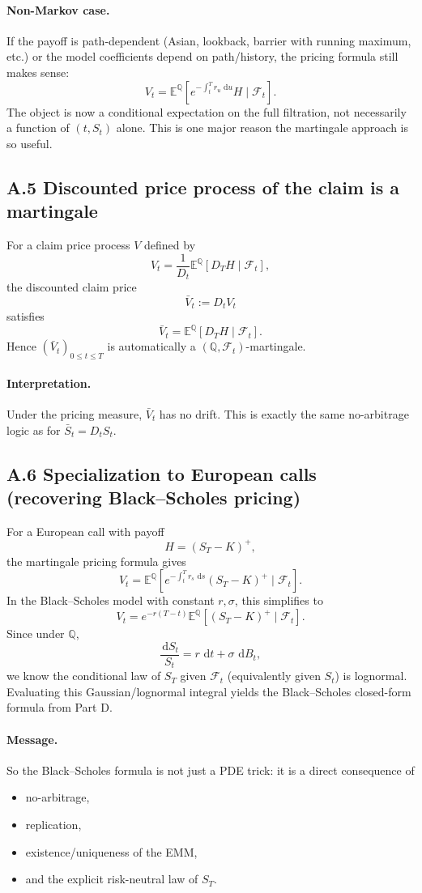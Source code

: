 \documentclass[11pt]{article}
\newcommand{\Qbb}{\mathbb{Q}}
\newcommand{\E}{\mathbb{E}}
\newcommand{\dd}{\,\mathrm{d}}
\newcommand{\1}{\mathbf{1}}
\begin{document}
\paragraph{Non-Markov case.}
If the payoff is path-dependent (Asian, lookback, barrier with running maximum, etc.) or the model coefficients depend on path/history,
the pricing formula still makes sense:
$$
V_t=\E^{\Qbb}\!\left[e^{-\int_t^T r_u\,\dd u}H\mid \mathcal F_t\right].
$$
The object is now a conditional expectation on the full filtration, not necessarily a function of \((t,S_t)\) alone.
This is one major reason the martingale approach is so useful.

\subsection*{A.5 Discounted price process of the claim is a martingale}

For a claim price process \(V\) defined by
$$
V_t=\frac{1}{D_t}\E^{\Qbb}[D_TH\mid\mathcal F_t],
$$
the discounted claim price
$$
\bar V_t:=D_tV_t
$$
satisfies
$$
\bar V_t=\E^{\Qbb}[D_TH\mid\mathcal F_t].
$$
Hence \((\bar V_t)_{0\le t\le T}\) is automatically a \((\Qbb,\mathcal F_t)\)-martingale.

\paragraph{Interpretation.}
Under the pricing measure, \(\bar V_t\) has no drift.
This is exactly the same no-arbitrage logic as for \(\bar S_t=D_tS_t\).

\subsection*{A.6 Specialization to European calls (recovering Black--Scholes pricing)}

For a European call with payoff
$$
H=(S_T-K)^+,
$$
the martingale pricing formula gives
$$
V_t=\E^{\Qbb}\!\left[e^{-\int_t^T r_s\,\dd s}(S_T-K)^+\mid \mathcal F_t\right].
$$
In the Black--Scholes model with constant \(r,\sigma\), this simplifies to
$$
V_t=e^{-r(T-t)}\E^{\Qbb}\!\left[(S_T-K)^+\mid \mathcal F_t\right].
$$
Since under \(\Qbb\),
$$
\frac{\dd S_t}{S_t}=r\,\dd t+\sigma\,\dd B_t,
$$
we know the conditional law of \(S_T\) given \(\mathcal F_t\) (equivalently given \(S_t\)) is lognormal.
Evaluating this Gaussian/lognormal integral yields the Black--Scholes closed-form formula from Part D.

\paragraph{Message.}
So the Black--Scholes formula is not just a PDE trick: it is a direct consequence of
\begin{itemize}[leftmargin=1.4em]
    \item no-arbitrage,
    \item replication,
    \item existence/uniqueness of the EMM,
    \item and the explicit risk-neutral law of \(S_T\).
\end{itemize}
\end{document}
